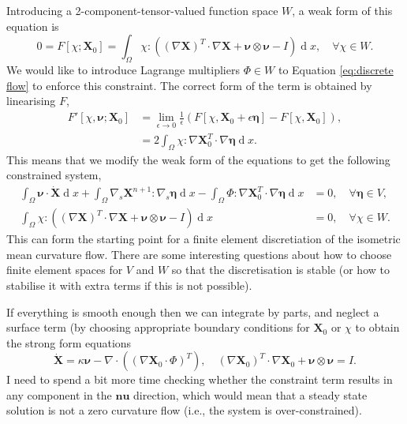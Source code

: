 \documentclass{article}
\def\MM#1{\boldsymbol{#1}}
\def\MM#1{\boldsymbol{#1}}
\DeclareMathOperator{\diff}{d}
\begin{document}
Introducing a 2-component-tensor-valued function space $W$, a weak
form of this equation is
\begin{equation} 
0 = F[\chi;\MM{X}_0] = \int_\Omega \chi : \left(
(\nabla\MM{X})^T\cdot\nabla\MM{X} + \MM{\nu}\otimes\MM{\nu} - I\right)\diff x,
\quad \forall \chi \in W.
\end{equation}
We would like to introduce Lagrange multipliers $\Phi\in W$ to
Equation \eqref{eq:discrete flow} to enforce this constraint. The correct
form of the term is obtained by linearising $F$,
\begin{align}
  F'[\chi,\MM{\nu};\MM{X}_0] & =
  \lim_{\epsilon\to 0}\frac{1}{\epsilon}
  \left(F[\chi,\MM{X}_0+\epsilon \MM{\eta}] - F[\chi,\MM{X}_0]\right), \\
  & = 2\int_\Omega \chi:\nabla\MM{X}^T_0\cdot \nabla\MM{\eta}\diff x.
\end{align}
This means that we modify the weak form of the equations to get the
following constrained system,
\begin{align}
\int_\Omega \MM{\nu} \cdot \dot{\MM{X}} \diff x
+\int_\Omega \nabla_s \MM{X}^{n+1} : \nabla_s \MM{\MM{\eta}}\diff x 
- \int_\Omega \Phi : \nabla\MM{X}^T_0\cdot \nabla\MM{\eta}\diff x &= 0,
\quad \forall \MM{\MM{\eta}}\in V, \\
\int_\Omega \chi : \left(
(\nabla\MM{X})^T\cdot\nabla\MM{X} + \MM{\nu}\otimes\MM{\nu} - I\right)\diff x & =
0, 
\quad \forall \chi \in W.
\end{align}
This can form the starting point for a finite element discretiation of
the isometric mean curvature flow. There are some interesting
questions about how to choose finite element spaces for $V$ and $W$ so
that the discretisation is stable (or how to stabilise it with extra
terms if this is not possible).

If everything is smooth enough then we can integrate by parts, and neglect
a surface term (by choosing appropriate boundary conditions for $\MM{X}_0$ or
$\chi$ to obtain the strong form equations
\begin{equation}
  \dot{\MM{X}} = \kappa\MM{\nu} - \nabla\cdot\left(\left(\nabla\MM{X}_0\cdot\Phi\right)^T\right),
  \quad (\nabla \MM{X}_0)^T\cdot \nabla \MM{X}_0 + \MM{\nu}\otimes\MM{\nu} = I.
\end{equation}
I need to spend a bit more time checking whether the constraint term
results in any component in the $\MM{nu}$ direction, which would mean that
a steady state solution is not a zero curvature flow (i.e., the system
is over-constrained).
\end{document}
